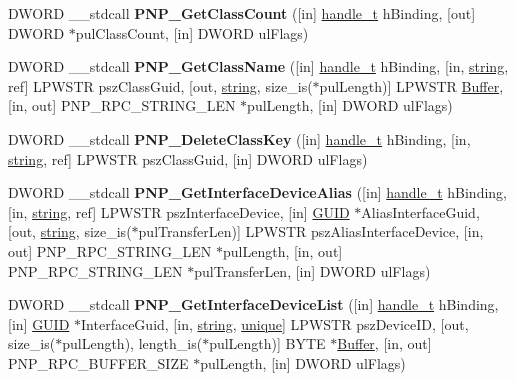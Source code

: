 \begin{DoxyCompactItemize}
D\+W\+O\+RD \+\_\+\+\_\+stdcall {\bfseries P\+N\+P\+\_\+\+Get\+Class\+Count} (\mbox{[}in\mbox{]} \hyperlink{interfacevoid}{handle\+\_\+t} h\+Binding, \mbox{[}out\mbox{]} D\+W\+O\+RD $\ast$pul\+Class\+Count, \mbox{[}in\mbox{]} D\+W\+O\+RD ul\+Flags)
\item 
\mbox{\label{interfacepnp_a5b71595195d235c9b925bffc1578ed39}} 
D\+W\+O\+RD \+\_\+\+\_\+stdcall {\bfseries P\+N\+P\+\_\+\+Get\+Class\+Name} (\mbox{[}in\mbox{]} \hyperlink{interfacevoid}{handle\+\_\+t} h\+Binding, \mbox{[}in, \hyperlink{structstring}{string}, ref\mbox{]} L\+P\+W\+S\+TR psz\+Class\+Guid, \mbox{[}out, \hyperlink{structstring}{string}, size\+\_\+is($\ast$pul\+Length)\mbox{]} L\+P\+W\+S\+TR \hyperlink{class_buffer}{Buffer}, \mbox{[}in, out\mbox{]} P\+N\+P\+\_\+\+R\+P\+C\+\_\+\+S\+T\+R\+I\+N\+G\+\_\+\+L\+EN $\ast$pul\+Length, \mbox{[}in\mbox{]} D\+W\+O\+RD ul\+Flags)
\item 
\mbox{\label{interfacepnp_a1e30d42371a29879004d5ceda4282c91}} 
D\+W\+O\+RD \+\_\+\+\_\+stdcall {\bfseries P\+N\+P\+\_\+\+Delete\+Class\+Key} (\mbox{[}in\mbox{]} \hyperlink{interfacevoid}{handle\+\_\+t} h\+Binding, \mbox{[}in, \hyperlink{structstring}{string}, ref\mbox{]} L\+P\+W\+S\+TR psz\+Class\+Guid, \mbox{[}in\mbox{]} D\+W\+O\+RD ul\+Flags)
\item 
\mbox{\label{interfacepnp_a521da4fdcc1c0a6d1e9a6ac971d8b453}} 
D\+W\+O\+RD \+\_\+\+\_\+stdcall {\bfseries P\+N\+P\+\_\+\+Get\+Interface\+Device\+Alias} (\mbox{[}in\mbox{]} \hyperlink{interfacevoid}{handle\+\_\+t} h\+Binding, \mbox{[}in, \hyperlink{structstring}{string}, ref\mbox{]} L\+P\+W\+S\+TR psz\+Interface\+Device, \mbox{[}in\mbox{]} \hyperlink{interface_g_u_i_d}{G\+U\+ID} $\ast$Alias\+Interface\+Guid, \mbox{[}out, \hyperlink{structstring}{string}, size\+\_\+is($\ast$pul\+Transfer\+Len)\mbox{]} L\+P\+W\+S\+TR psz\+Alias\+Interface\+Device, \mbox{[}in, out\mbox{]} P\+N\+P\+\_\+\+R\+P\+C\+\_\+\+S\+T\+R\+I\+N\+G\+\_\+\+L\+EN $\ast$pul\+Length, \mbox{[}in, out\mbox{]} P\+N\+P\+\_\+\+R\+P\+C\+\_\+\+S\+T\+R\+I\+N\+G\+\_\+\+L\+EN $\ast$pul\+Transfer\+Len, \mbox{[}in\mbox{]} D\+W\+O\+RD ul\+Flags)
\item 
\mbox{\label{interfacepnp_af4d185122a36f2a9808c2420a3d03dcf}} 
D\+W\+O\+RD \+\_\+\+\_\+stdcall {\bfseries P\+N\+P\+\_\+\+Get\+Interface\+Device\+List} (\mbox{[}in\mbox{]} \hyperlink{interfacevoid}{handle\+\_\+t} h\+Binding, \mbox{[}in\mbox{]} \hyperlink{interface_g_u_i_d}{G\+U\+ID} $\ast$Interface\+Guid, \mbox{[}in, \hyperlink{structstring}{string}, \hyperlink{interfaceunique}{unique}\mbox{]} L\+P\+W\+S\+TR psz\+Device\+ID, \mbox{[}out, size\+\_\+is($\ast$pul\+Length), length\+\_\+is($\ast$pul\+Length)\mbox{]} B\+Y\+TE $\ast$\hyperlink{class_buffer}{Buffer}, \mbox{[}in, out\mbox{]} P\+N\+P\+\_\+\+R\+P\+C\+\_\+\+B\+U\+F\+F\+E\+R\+\_\+\+S\+I\+ZE $\ast$pul\+Length, \mbox{[}in\mbox{]} D\+W\+O\+RD ul\+Flags)

\end{DoxyCompactItemize}
